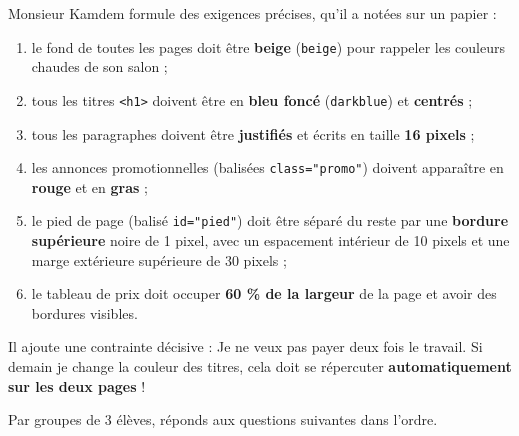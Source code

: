 \documentclass[11pt]{article}
\newcounter{popsec}
\newcounter{popsub}
\newcommand{\courssub}[1]{%
  \stepcounter{popsub}%
  \par\vspace{9pt}\noindent{\popxbold\fontsize{11.5}{13}\selectfont\color{popink}{\color{poporange}\thepopsec.\thepopsub}\hspace{6pt}#1}\par\nopagebreak\vspace{4pt}
}
\begin{document}
Monsieur Kamdem formule des exigences précises, qu'il a notées sur un papier :

\begin{enumerate}
  \item le fond de toutes les pages doit être \textbf{beige} (\texttt{beige}) pour rappeler les couleurs chaudes de son salon ;
  \item tous les titres \texttt{<h1>} doivent être en \textbf{bleu foncé} (\texttt{darkblue}) et \textbf{centrés} ;
  \item tous les paragraphes doivent être \textbf{justifiés} et écrits en taille \textbf{16 pixels} ;
  \item les annonces promotionnelles (balisées \texttt{class="promo"}) doivent apparaître en \textbf{rouge} et en \textbf{gras} ;
  \item le pied de page (balisé \texttt{id="pied"}) doit être séparé du reste par une \textbf{bordure supérieure} noire de 1 pixel, avec un espacement intérieur de 10 pixels et une marge extérieure supérieure de 30 pixels ;
  \item le tableau de prix doit occuper \textbf{60 \% de la largeur} de la page et avoir des bordures visibles.
\end{enumerate}

Il ajoute une contrainte décisive : \og Je ne veux pas payer deux fois le travail. Si demain je change la couleur des titres, cela doit se répercuter \textbf{automatiquement sur les deux pages} ! \fg{}

\courssub{Consignes}

Par groupes de 3 élèves, réponds aux questions suivantes dans l'ordre.
\end{document}
